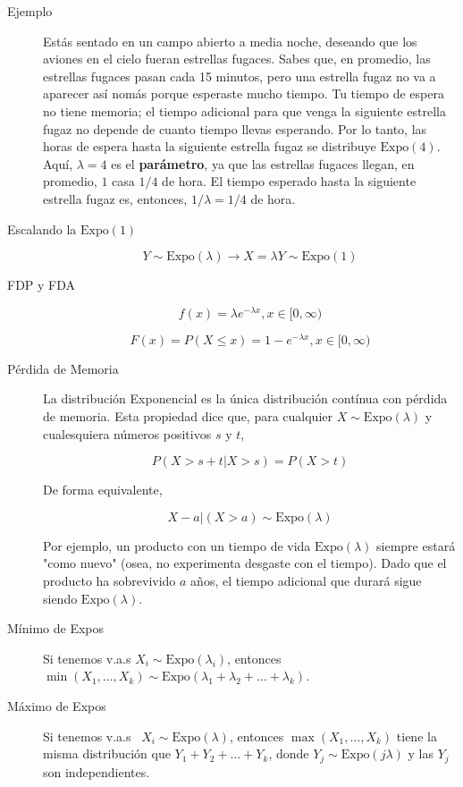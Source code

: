 \documentclass[12,landscape]{article}
\newcommand{\Expo}{\textrm{Expo}}
\begin{document}
\begin{multicols*}{3}
\begin{description}
    \item[Ejemplo] Estás sentado en un campo abierto a media noche, deseando que los aviones en el cielo fueran estrellas fugaces. Sabes que, en promedio, las estrellas fugaces pasan cada 15 minutos, pero una estrella fugaz no va a aparecer así nomás porque esperaste mucho tiempo. Tu tiempo de espera no tiene memoria; el tiempo adicional para que venga la siguiente estrella fugaz no depende de cuanto tiempo llevas esperando. Por lo tanto, las horas de espera hasta la siguiente estrella fugaz se distribuye $\Expo(4)$. Aquí, $\lambda=4$ es el \textbf{parámetro}, ya que las estrellas fugaces llegan, en promedio, $1$ casa $1/4$ de hora. El tiempo esperado hasta la siguiente estrella fugaz es, entonces, $1/\lambda = 1/4$ de hora.
    
    
    \item[Escalando la $\Expo(1)$]
        \[Y \sim \Expo(\lambda) \rightarrow X = \lambda Y \sim \Expo(1)\]
     
     \item[FDP y FDA] 
 \[f(x) = \lambda e^{-\lambda x}, x \in [0, \infty)\]
 
 \[F(x) = P(X \leq x) = 1 - e^{-\lambda x}, x \in [0, \infty)\]
    
    \item[Pérdida de Memoria] La distribución Exponencial es la única distribución contínua con pérdida de memoria. Esta propiedad dice que, para cualquier $X \sim \Expo(\lambda)$ y cualesquiera números positivos $s$ y $t$,
    
    \[P(X > s + t | X > s) = P(X > t)\]
    
    De forma equivalente,
    
    \[X - a | (X > a) \sim \Expo(\lambda)\]
    
    Por ejemplo, un producto con un tiempo de vida $\Expo(\lambda)$ siempre estará "como nuevo" (osea, no experimenta desgaste con el tiempo). Dado que el producto ha sobrevivido $a$ años, el tiempo adicional que durará sigue siendo $\Expo(\lambda)$.

    \item[Mínimo de Expos] Si tenemos v.a.s $X_i \sim \Expo(\lambda_i)$, entonces $\min(X_1, \dots, X_k) \sim \Expo(\lambda_1 + \lambda_2 + \dots + \lambda_k)$. 
    \item[Máximo de Expos] Si tenemos v.a.s ~$X_i \sim \Expo(\lambda)$, entonces $\max(X_1, \dots, X_k)$ tiene la misma distribución que $Y_1+Y_2+\dots+Y_k$, donde $Y_j \sim \Expo(j\lambda)$ y las $Y_j$ son independientes.     
\end{description}


\end{multicols*}
\end{document}
